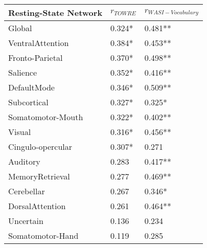 \begin{tabular}{lll}
\toprule
Resting-State Network & $r_{TOWRE}$ & $r_{WASI-Vocabulary}$ \\
\midrule
Global           & 0.324* & 0.481** \\
VentralAttention  &        0.384* &       0.453** \\
Fronto-Parietal   &        0.370* &       0.498** \\
Salience          &        0.352* &       0.416** \\
DefaultMode       &        0.346* &       0.509** \\
Subcortical       &        0.327* &       0.325*  \\
Somatomotor-Mouth &        0.322* &       0.402** \\
Visual            &        0.316* &       0.456** \\
Cingulo-opercular &        0.307* &       0.271   \\
Auditory          &        0.283 &       0.417**  \\
MemoryRetrieval   &        0.277 &       0.469**  \\
Cerebellar        &        0.267 &       0.346*   \\
DorsalAttention   &        0.261 &       0.464**  \\
Uncertain         &        0.136 &       0.234    \\
Somatomotor-Hand  &        0.119 &       0.285    \\
\bottomrule
\end{tabular}